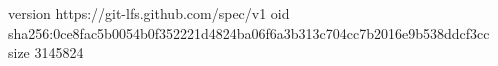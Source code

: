 version https://git-lfs.github.com/spec/v1
oid sha256:0ce8fac5b0054b0f352221d4824ba06f6a3b313c704cc7b2016e9b538ddcf3cc
size 3145824
